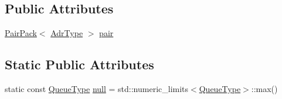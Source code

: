 \subsection*{Public Attributes}
\begin{DoxyCompactItemize}
\item 
\hyperlink{structPairPack}{Pair\-Pack}$<$ \hyperlink{structPoolQueue_3_01Adr_3_01ADR__TYPE_01_4_01_4_a064c3ab93d00612f59153ae3e22f8cce}{Adr\-Type} $>$ \hyperlink{structPoolQueue_3_01Adr_3_01ADR__TYPE_01_4_01_4_abacebad171d03b81313d5ef25b11a5f5}{pair}
\end{DoxyCompactItemize}
\subsection*{Static Public Attributes}
\begin{DoxyCompactItemize}
\item 
static const \hyperlink{structPoolQueue_3_01Adr_3_01ADR__TYPE_01_4_01_4_af405a8f20e7744630ddff4f0dd7a215a}{Queue\-Type} \hyperlink{structPoolQueue_3_01Adr_3_01ADR__TYPE_01_4_01_4_a4a6129865e35984b1e36ecfee31cc74c}{null} = std\-::numeric\-\_\-limits$<$\hyperlink{structPoolQueue_3_01Adr_3_01ADR__TYPE_01_4_01_4_af405a8f20e7744630ddff4f0dd7a215a}{Queue\-Type}$>$\-::max()
\end{DoxyCompactItemize}


